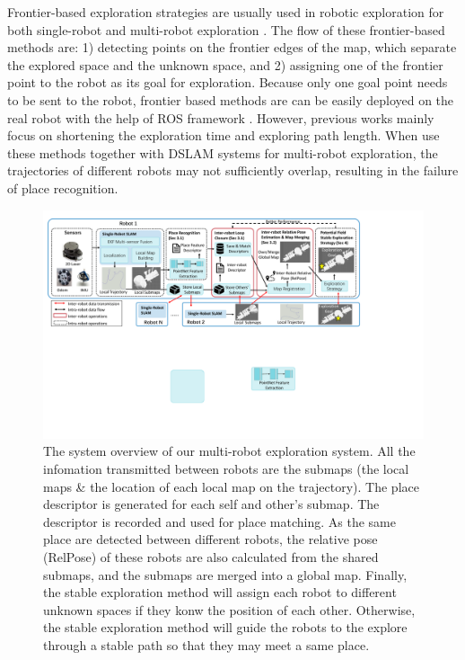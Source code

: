 Frontier-based exploration strategies are usually used in robotic exploration for both single-robot and multi-robot exploration \cite{senarathne2013efficient, umari2017autonomous, orvsulic2019efficient}.
The flow of these frontier-based methods are: 1) detecting points on the frontier edges of the map, which separate the explored space and the unknown space, and 2) assigning one of the frontier point to the robot as its goal for exploration. 
Because only one goal point needs to be sent to the robot, frontier based methods are can be easily deployed on the real robot with the help of ROS framework \cite{quigley2009ros}.
However, previous works mainly focus on shortening the exploration time and exploring path length. 
When use these methods together with DSLAM systems for multi-robot exploration, the trajectories of different robots may not sufficiently overlap, resulting in the failure of place recognition.

\begin{figure}[t]
    \centering
    \includegraphics[width=0.99\linewidth]{fig/dataflow.pdf}
    \caption{The system overview of our multi-robot exploration system. All the infomation transmitted between robots are the submaps (the local maps \& the location of each local map on the trajectory). 
    The place descriptor is generated for each self and other's submap. The descriptor is recorded and used for place matching. 
    As the same place are detected between different robots, the relative pose (RelPose) of these robots are also calculated from the shared submaps, and the submaps are merged into a global map. 
    Finally, the stable exploration method will assign each robot to different unknown spaces if they konw the position of each other. 
    Otherwise, the stable exploration method will guide the robots to the explore through a stable path so that they may meet a same place. }
    \label{fig:sysframe}
\end{figure}

